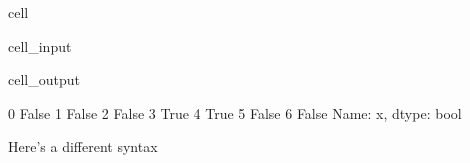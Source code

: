 \documentclass[letterpaper,10pt,english]{jupyterBook}
\begin{document}
\begin{sphinxuseclass}{cell}\begin{sphinxVerbatimInput}

\begin{sphinxuseclass}{cell_input}
\begin{sphinxVerbatim}[commandchars=\\\{\}]
\end{sphinxVerbatim}

\end{sphinxuseclass}\end{sphinxVerbatimInput}
\begin{sphinxVerbatimOutput}

\begin{sphinxuseclass}{cell_output}
\begin{sphinxVerbatim}[commandchars=\\\{\}]
0    False
1    False
2    False
3     True
4     True
5    False
6    False
Name: x, dtype: bool
\end{sphinxVerbatim}

\end{sphinxuseclass}\end{sphinxVerbatimOutput}

\end{sphinxuseclass}
\sphinxAtStartPar
Here’s a different syntax
\end{document}
